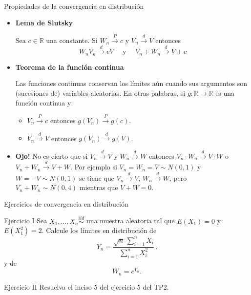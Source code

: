 \documentclass{beamer}
\theoremstyle{definition}
\newcommand{\cp}{\overset{P}{\rightarrow}}
\newcommand{\cw}{\overset{d}{\rightarrow}}
\begin{document}
\begin{frame}{\color{rosee} Propiedades de la convergencia en distribución}
\small
\begin{itemize}

\item \textbf{Lema de Slutsky}
  
    Sea $c\in\mathbb{R}$ una constante. Si $W_n \cp c$ y $V_n\cw V$
    entonces
    \[W_n V_n \cw c V \quad \text{ y } \quad V_n+ W_n \cw V +c\]
  
    \item \textbf{Teorema de la función continua}

 Las funciones continuas conservan los límites aún cuando sus argumentos son (sucesiones de) variables aleatorias. En otras palabras, si $g:\mathbb{R}\to\mathbb{R}$ es una función continua y:\medskip

\begin{itemize}
\item $V_{n} \cp c$ entonces $g(V_{n})\cp g(c)$.\medskip

\item $V_{n} \cw V$ entonces $g(V_{n})\cw g(V)$.\medskip
\end{itemize}
\item \color{rosee}\textbf{Ojo!} \color{black} No es cierto que si $V_n\cw V$ y $W_n\cw W$ entonces
    $V_n\cdot W_n\cw V\cdot W$ o $V_n+W_n \cw V+W$. Por ejemplo si $V_n=W_n=V\sim N(0,1)$ y $W=-V\sim N(0,1)$ se tiene que $V_n\cw V$, $W_n\cw W$, pero $V_n+W_n\sim N(0,4)$ mientras que $V+W=0$.
    \end{itemize}
\end{frame}


\begin{frame}{\color{rosee}Ejercicios de convergencia en distribución}
  \begin{exampleblock}{Ejercicio I}
    Sea $X_{1},\dots,X_n\stackrel{iid}{\sim}$ una muestra aleatoria tal que $E(X_1)=0$ y
    $E(X_1^2)=2$. Calcule los l\'imites en distribuci\'on de
    \[Y_n=\frac{\sqrt{n}\, \displaystyle\sum_{i=1}^nX_{i}
    }{\sum\limits_{i=1}^nX_{i}^{2}}\,.\]
    y de
    $$
    W_{n}=e^{Y_{n}}.
    $$
  \end{exampleblock}
  
  \begin{exampleblock}{Ejercicio II}
Resuelva el inciso 5 del ejercicio 5 del TP2.
  \end{exampleblock}
\end{frame}
\end{document}
